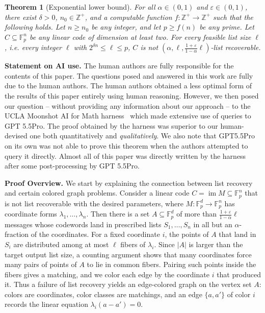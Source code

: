 \documentclass{amsart}
\newtheorem{theorem}{Theorem}
\theoremstyle{definition}
\theoremstyle{remark}
\newcommand{\Fp}{\mathbb{F}_p}
\begin{document}
\begin{theorem}[Exponential lower bound]\label{thm:lower}
    For all $\alpha \in (0,1)$ and $\varepsilon \in (0,1)$, there exist $\delta > 0$, $n_0 \in \mathbb{Z}^+$, and a computable function $f : \mathbb{Z}^+ \rightarrow \mathbb{Z}^+$ such that the following holds. Let $n \geq n_0$ be any integer, and let $p \geq f(n)$ be any prime. Let $C \subseteq \Fp^n$ be any linear code of dimension at least two. For every feasible list size $\ell$, i.e. every integer $\ell$ with $2^{\delta n}\le \ell\le p$, $C$ is not $(\alpha, \ell, \frac{1+\varepsilon}{1-\alpha}\ell)$-list recoverable.
\end{theorem}

\textbf{Statement on AI use.}
The human authors are fully responsible for the contents of this paper.
The questions posed and answered in this work are fully due to the human authors.
The human authors obtained a less optimal form of the results of this paper entirely using human reasoning. However, we then posed our question -- without providing any information about our approach -- to the UCLA Moonshot AI for Math harness~\cite{MoonshotHarness} which made extensive use of queries to GPT 5.5Pro. 
The proof obtained by the harness was superior to our human-devised one both quantitatively and \emph{qualitatively}. We also note that GPT5.5Pro on its own was not able to prove this theorem when the authors attempted to query it directly. Almost all of this paper was directly written by the harness after some post-processing by GPT 5.5Pro.

\textbf{Proof Overview.}
We start by explaining the connection between list recovery and certain colored graph problems. Consider a linear code $C=\operatorname{im}M\subseteq\Fp^n$ that is not list recoverable with the desired parameters, where $M:\Fp^d\to\Fp^n$ has coordinate forms $\lambda_1,\ldots,\lambda_n$. Then there is a set $A\subseteq\Fp^d$ of more than $\frac{1+\varepsilon}{1-\alpha}\ell$ messages whose codewords land in prescribed lists $S_1,\ldots,S_n$ in all but an $\alpha$-fraction of the coordinates. For a fixed coordinate $i$, the points of $A$ that land in $S_i$ are distributed among at most $\ell$ fibers of $\lambda_i$. Since $|A|$ is larger than the target output list size, a counting argument shows that many coordinates force many pairs of points of $A$ to lie in common fibers. Pairing such points inside the fibers gives a matching, and we color each edge by the coordinate $i$ that produced it. Thus a failure of list recovery yields an edge-colored graph on the vertex set $A$: colors are coordinates, color classes are matchings, and an edge $\{a,a'\}$ of color $i$ records the linear equation $\lambda_i(a-a')=0$.
\end{document}
